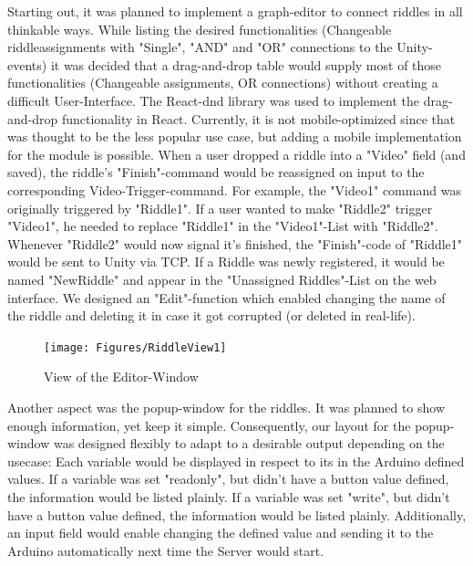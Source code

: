 Starting out, it was planned to implement a graph-editor to connect riddles in all thinkable ways.
While listing the desired functionalities (Changeable riddleassignments with "Single", "AND" and "OR" connections to the Unity-events) it was decided that a drag-and-drop table would supply most of those functionalities (Changeable assignments, OR connections) without creating a difficult User-Interface.
The React-dnd library \parencite{reactDND} was used to implement the drag-and-drop functionality in React. 
Currently, it is not mobile-optimized since that was thought to be the less popular use case, but adding a mobile implementation for the module is possible.
When a user dropped a riddle into a "Video" field (and saved), the riddle's "Finish"-command would be reassigned on input to the corresponding Video-Trigger-command.
For example, the "Video1" command was originally triggered by "Riddle1".
If a user wanted to make "Riddle2" trigger "Video1", he needed to replace "Riddle1" in the "Video1"-List with "Riddle2".
Whenever "Riddle2" would now signal it's finished, the "Finish"-code of "Riddle1" would be sent to Unity via TCP.
If a Riddle was newly registered, it would be named "NewRiddle" and appear in the "Unassigned Riddles"-List on the web interface.
We designed an "Edit"-function which enabled changing the name of the riddle and deleting it in case it got corrupted (or deleted in real-life).

\begin{figure}[t]
    \centering
	\texttt{[image: Figures/RiddleView1]}
	\decoRule
	\caption[Editor-Window]{View of the Editor-Window}
	\label{fig:archFrontend}
\end{figure}


Another aspect was the popup-window for the riddles. It was planned to show enough information, yet keep it simple.
Consequently, our layout for the popup-window was designed flexibly to adapt to a desirable output depending on the usecase:
Each variable would be displayed in respect to its in the Arduino defined values.
If a variable was set "readonly", but didn't have a button value defined, the information would be listed plainly.
If a variable was set "write", but didn't have a button value defined, the information would be listed plainly.
Additionally, an input field would enable changing the defined value and sending it to the Arduino automatically next time the Server would start.

